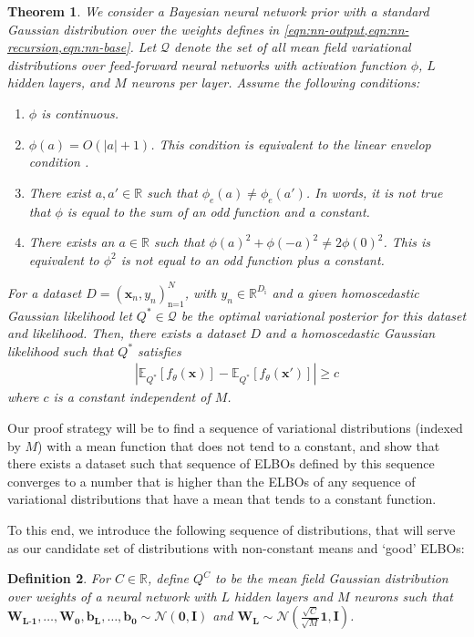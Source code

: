 \documentclass[twoside]{article}
\renewcommand{\ss}[1]{_{\text{#1}}}
\newcommand{\vnull}{\mathbf{0}}
\newcommand{\vx}{\mathbf{x}}
\newcommand{\mI}{\mathbf{I}}
\newcommand{\E}{\mathbb{E}}
\newcommand{\Q}{\mathbb{Q}}
\renewcommand{\Q}{\ensuremath{Q}}
\newcommand{\R}{\mathbb{R}}
\newcommand{\Normal}{\mathcal{N}}
\renewcommand{\ss}[1]{_{\text{#1}}}        %
\theoremstyle{theoremstyle}
\newtheorem{theorem}{Theorem}
\newtheorem{definition}[theorem]{Definition}
\begin{document}
\begin{theorem}\label{thm:app-counterexample}
 We consider a Bayesian neural network prior with a standard Gaussian distribution over the weights defines in \cref{eqn:nn-output,eqn:nn-recursion,eqn:nn-base}. Let $\mathcal{Q}$ denote the set of all mean field variational distributions over feed-forward neural networks with activation function $\phi$, $L$ hidden layers, and $M$ neurons per layer.
    Assume the following conditions:
    \begin{enumerate}[label=\roman*.,itemsep=0pt,topsep=0pt,partopsep=0pt,parsep=0pt]
        \item $\phi$ is continuous.
        \item
            $\phi(a) = O(|a|+1)$.
            This condition is equivalent to the linear envelop condition \citet{matthews_2018}.
        \item There exist $a,a' \in \R$ such that $\phi_e(a) \neq \phi_e(a')$. In words, it is not true that $\phi$ is equal to the sum of an odd function and a constant.
        \item There exists an $a \in \R$ such that $\phi(a)^2+\phi(-a)^2 \neq 2\phi(0)^2$. This is equivalent to $\phi^2$ is not equal to an odd function plus a constant.
    \end{enumerate}
    For a dataset $D=(\vx_n, y_n)\ss{n=1}^N$, with $y_n \in \R^{D\ss{i}}$ and a given homoscedastic Gaussian likelihood let $\Q^* \in \mathcal{Q}$ be the optimal variational posterior for this dataset and likelihood. Then, there exists a dataset $D$ and a homoscedastic Gaussian likelihood such that $\Q^*$ satisfies 
    \begin{align}
        |\E_{\Q^*}[f_{\theta}(\vx)]-\E_{\Q^*}[f_{\theta}(\vx')]| \geq c
    \end{align}
    where $c$ is a constant independent of $M$. 
\end{theorem}

Our proof strategy will be to find a sequence of variational distributions (indexed by $M$) with a mean function that does not tend to a constant, and show that there exists a dataset such that sequence of ELBOs defined by this sequence  converges to a number that is higher than the ELBOs of any sequence of variational distributions that have a mean that tends to a constant function.

To this end, we introduce the following sequence of distributions, that will serve as our candidate set of distributions with non-constant means and `good' ELBOs:
\begin{definition}
 For $C \in \R$, define $\Q^C$ to be the mean field Gaussian distribution over weights of a neural network with $L$ hidden layers and $M$ neurons such that $\mathbf{W\ss{L-1}},\dotsc, \mathbf{W\ss{0}}, \mathbf{b\ss{L}}, \dotsc, \mathbf{b\ss{0}} \sim \Normal(\vnull, \mI)$ and $\mathbf{W\ss{L}}\sim \Normal(\frac{\sqrt{C}}{\sqrt{M}}\mathbf{1},\mI)$.
\end{definition}
\end{document}
